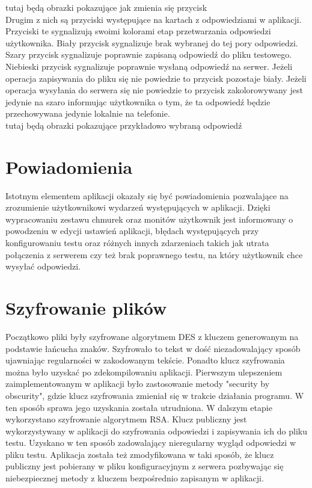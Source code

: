 \documentclass{report}
\begin{document}
		tutaj będą obrazki pokazujące jak zmienia się przycisk\\
		
		Drugim z nich są przyciski występujące na kartach z odpowiedziami w aplikacji. Przyciski te sygnalizują swoimi kolorami etap przetwarzania odpowiedzi użytkownika. Biały przycisk sygnalizuje brak wybranej do tej pory odpowiedzi. Szary przycisk sygnalizuje poprawnie zapisaną odpowiedź do pliku testowego. Niebieski przycisk sygnalizuje poprawnie wysłaną odpowiedź na serwer. Jeżeli operacja zapisywania do pliku się nie powiedzie to przycisk pozostaje biały. Jeżeli operacja wysyłania do serwera się nie powiedzie to przycisk zakolorowywany jest jedynie na szaro informując użytkownika o tym, że ta odpowiedź będzie przechowywana jedynie lokalnie na telefonie.\\
		
		tutaj będą obrazki pokazujące przykładowo wybraną odpowiedź\\
		
		\section{Powiadomienia}
		
		Istotnym elementem aplikacji okazały się być powiadomienia pozwalające na zrozumienie użytkownikowi wydarzeń występujących w aplikacji. Dzięki wypracowaniu zestawu chmurek oraz monitów użytkownik jest informowany o powodzeniu w edycji ustawień aplikacji, błędach występujących przy konfigurowaniu testu oraz różnych innych zdarzeniach takich jak utrata połączenia z serwerem czy też brak poprawnego testu, na który użytkownik chce wysyłać odpowiedzi.
		
	
		\section{Szyfrowanie plików}
	
		Początkowo pliki były szyfrowane algorytmem DES z kluczem generowanym na podstawie łańcucha znaków. Szyfrowało to tekst w dość niezadowalający sposób ujawniając regularności w zakodowanym tekście. Ponadto klucz szyfrowania można było uzyskać po zdekompilowaniu aplikacji. Pierwszym ulepszeniem zaimplementowanym w aplikacji było zastosowanie metody "security by obscurity", gdzie klucz szyfrowania zmieniał się w trakcie działania programu. W ten sposób sprawa jego uzyskania została utrudniona.
		W dalszym etapie wykorzystano szyfrowanie algorytmem RSA. Klucz publiczny jest wykorzystywany w aplikacji do szyfrowania odpowiedzi i zapisywania ich do pliku testu. Uzyskano w ten sposób zadowalający nieregularny wygląd odpowiedzi w pliku testu. Aplikacja została też zmodyfikowana w taki sposób, że klucz publiczny jest pobierany w pliku konfiguracyjnym z serwera pozbywając się niebezpiecznej metody z kluczem bezpośrednio zapisanym w aplikacji.
	
\end{document}

